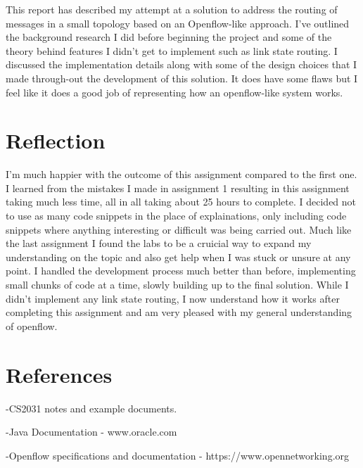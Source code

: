 \documentclass{article}
\begin{document}
This report has described my attempt at a solution to address the routing of messages in a small topology based on an Openflow-like approach. I've outlined the background research I did before beginning the project and some of the theory behind features I didn't get to implement such as link state routing. I discussed the implementation details along with some of the design choices that I made through-out the development of this solution. It does have some flaws but I feel like it does a good job of representing how an openflow-like system works.

\section{Reflection}

I'm much happier with the outcome of this assignment compared to the first one. I learned from the mistakes I made in assignment 1 resulting in this assignment taking much less time, all in all taking about 25 hours to complete. I decided not to use as many code snippets in the place of explainations, only including code snippets where anything interesting or difficult was being carried out. Much like the last assignment I found the labs to be a cruicial way to expand my understanding on the topic and also get help when I was stuck or unsure at any point. I handled the development process much better than before, implementing small chunks of code at a time, slowly building up to the final solution. While I didn't implement any link state routing, I now understand how it works after completing this assignment and am very pleased with my general understanding of openflow.

\section{References}

-CS2031 notes and example documents.

-Java Documentation - www.oracle.com

-Openflow specifications and documentation - https://www.opennetworking.org
\end{document}
